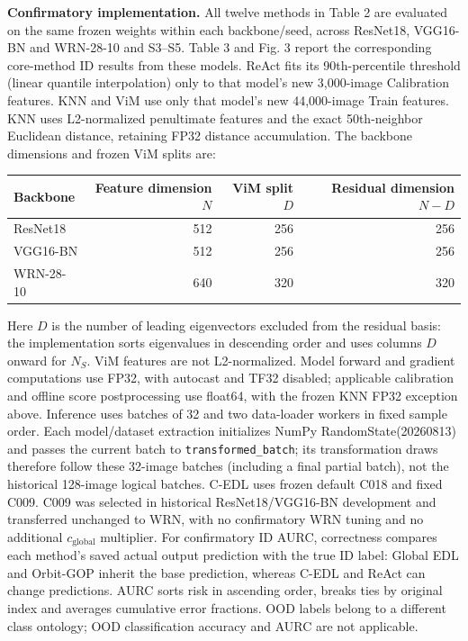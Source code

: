 \documentclass[11pt,a4paper]{article}
\begin{document}
\noindent\textbf{Confirmatory implementation.} All twelve methods in Table 2 are evaluated on the same frozen weights within each backbone/seed, across ResNet18, VGG16-BN and WRN-28-10 and S3--S5. Table 3 and Fig. 3 report the corresponding core-method ID results from these models. ReAct fits its 90th-percentile threshold (linear quantile interpolation) only to that model's new 3,000-image Calibration features. KNN and ViM use only that model's new 44,000-image Train features. KNN uses L2-normalized penultimate features and the exact 50th-neighbor Euclidean distance, retaining FP32 distance accumulation. The backbone dimensions and frozen ViM splits are:
\begin{center}
\begin{tabular}{lrrr}
\toprule
Backbone & Feature dimension $N$ & ViM split $D$ & Residual dimension $N-D$ \\
\midrule
ResNet18 & 512 & 256 & 256 \\
VGG16-BN & 512 & 256 & 256 \\
WRN-28-10 & 640 & 320 & 320 \\
\bottomrule
\end{tabular}
\end{center}
Here $D$ is the number of leading eigenvectors excluded from the residual basis: the implementation sorts eigenvalues in descending order and uses columns $D$ onward for $N_S$. ViM features are not L2-normalized. Model forward and gradient computations use FP32, with autocast and TF32 disabled; applicable calibration and offline score postprocessing use float64, with the frozen KNN FP32 exception above. Inference uses batches of 32 and two data-loader workers in fixed sample order. Each model/dataset extraction initializes NumPy RandomState(20260813) and passes the current batch to \texttt{transformed\_batch}; its transformation draws therefore follow these 32-image batches (including a final partial batch), not the historical 128-image logical batches. C-EDL uses frozen default C018 and fixed C009. C009 was selected in historical ResNet18/VGG16-BN development and transferred unchanged to WRN, with no confirmatory WRN tuning and no additional $c_{\mathrm{global}}$ multiplier. For confirmatory ID AURC, correctness compares each method's saved actual output prediction with the true ID label: Global EDL and Orbit-GOP inherit the base prediction, whereas C-EDL and ReAct can change predictions. AURC sorts risk in ascending order, breaks ties by original index and averages cumulative error fractions. OOD labels belong to a different class ontology; OOD classification accuracy and AURC are not applicable.
\end{document}

